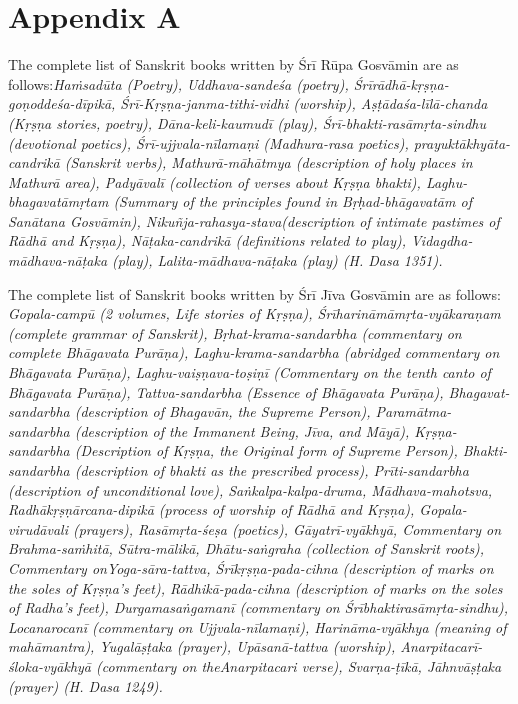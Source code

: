 \section*{Appendix A}

The complete list of Sanskrit books written by Śrī Rūpa Gosvāmin are as follows:{\sl  Haṁsadūta {\rm (Poetry)}, Uddhava-sandeśa {\rm (poetry)}, Śrīrādhā-\Break kṛṣṇa-goṇoddeśa-dīpikā, Śrī-Kṛṣṇa-janma-tithi-vidhi {\rm (worship)}, Aṣṭādaśa-\Break līlā-chanda {\rm (Kṛṣṇa stories, poetry)}, Dāna-keli-kaumudī {\rm (play)}, Śrī-bhakti-rasāmṛta-sindhu {\rm (devotional poetics)}, Śrī-ujjvala-nīlamaṇi {\rm (Madhura-\Break rasa poetics)}, prayuktākhyāta-candrikā {\rm (Sanskrit verbs)}, Mathurā-\Break māhātmya {\rm (description of holy places in Mathurā area)}, Padyāvalī {\rm (collection of verses about Kṛṣṇa bhakti)}, Laghu-bhagavatāmṛtam {\rm (Summary of the principles found in Bṛḥad-bhāgavatām of Sanātana Gosvāmin)}, Nikuñja-rahasya-stava{\rm (description of intimate pastimes of Rādhā and Kṛṣṇa)}, Nāṭaka-candrikā {\rm (definitions related to play)}, Vidagdha-mādha\-va-nāṭaka {\rm (play)}, Lalita-mādhava-nāṭaka {\rm (play)} {\rm (H. Dasa 1351)}.}

The complete list of Sanskrit books written by Śrī Jīva Gosvāmin are as follows: {\sl  Gopala-campū {\rm (2 volumes, Life stories of Kṛṣṇa)}, Śrīharināmā\-mṛta-vyākaraṇam {\rm (complete grammar of Sanskrit)}, Bṛhat-krama-sanda\-rbha {\rm (commentary on complete {\sl Bhāgavata Purāṇa})}, Laghu-krama-\Break sandarbha {\rm (abridged commentary on {\sl Bhāgavata Purāṇa})}, Laghu-vai\-ṣṇa\-va-toṣiṇī {\rm (Commentary on the tenth canto of {\sl Bhāgavata Purāṇa})}, Tattva-sandarbha {\rm (Essence of {\sl Bhāgavata Purāṇa})}, Bhagavat-sandarbha {\rm (description of Bhagavān, the Supreme Person)}, Paramātma-sandarbha {\rm (description of the Immanent Being, Jīva, and Māyā)}, Kṛṣṇa-sandarbha {\rm (Description of Kṛṣṇa, the Original form of Supreme Person)}, Bhakti-sandarbha {\rm (description of bhakti as the prescribed process)}, Prīti-sandarbha {\rm (description of unconditional love)}, Saṅkalpa-kalpa-druma, Mādhava-maho\-tsva, Radhākṛṣṇārcana-dipikā {\rm (process of worship of Rādhā and Kṛṣṇa)}, Gopala-virudāvali {\rm (prayers)}, Rasāmṛta-śeṣa {\rm (poetics)}, Gāyatrī-vyākhyā, Commentary on Brahma-saṁhitā, Sūtra-mālikā, Dhātu-saṅgraha {\rm (collection of Sanskrit roots)}, Commentary on\break Yoga-sāra-tattva, Śrīkṛṣṇa-pada-cihna {\rm (description of marks on the soles of Kṛṣṇa’s feet)}, Rādhikā-pada-cihna {\rm (description of marks on the soles of Radha’s feet)}, Durgamasaṅgamanī {\rm (commentary on {\sl Śrībhaktirasāmṛ\-ta-sindhu})}, Locanarocanī {\rm (commentary on {\sl Ujjvala-nīlamaṇi})}, Harināma-vyākhya  ({\rm meaning of} mahāmantra), Yugalāṣṭaka {\rm (prayer)}, Upāsanā-\Break tattva {\rm (worship)}, Anarpitacarī-śloka-vyākhyā {\rm (commentary on the\break Anarpitacari verse)}, Svarṇa-ṭīkā, Jāhnvāṣṭaka {\rm (prayer)} {\rm (H. Dasa 1249)}.} 

